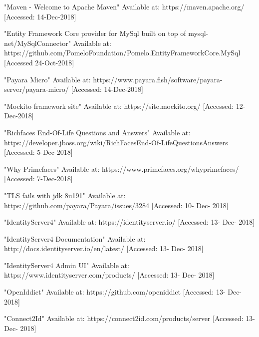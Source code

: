  "Maven - Welcome to Apache Maven"
Available at: https://maven.apache.org/ [Accessed: 14-Dec-2018]

 "Entity Framework Core provider for MySql built on top of mysql-net/MySqlConnector"
Available at: https://github.com/PomeloFoundation/Pomelo.EntityFrameworkCore.MySql
[Accessed 24-Oct-2018]

 "Payara Micro"
Available at: https://www.payara.fish/software/payara-server/payara-micro/ [Accessed: 14-Dec-2018]

 "Mockito framework site"
Available at: https://site.mockito.org/ [Accessed: 12-Dec-2018]

 "Richfaces End-Of-Life Questions and Answers"
Available at: https://developer.jboss.org/wiki/RichFacesEnd-Of-LifeQuestionsAnswers [Accessed: 5-Dec-2018]

 "Why Primefaces"
Available at: https://www.primefaces.org/whyprimefaces/ [Accessed: 7-Dec-2018]

 "TLS fails with jdk 8u191" Available at: https://github.com/payara/Payara/issues/3284 [Accessed: 10- Dec- 2018]

 "IdentityServer4" Available at: https://identityserver.io/ [Accessed: 13- Dec- 2018]

 "IdentityServer4 Documentation" Available at: http://docs.identityserver.io/en/latest/ [Accessed: 13- Dec- 2018]

 "IdentityServer4 Admin UI" Available at: https://www.identityserver.com/products/ [Accessed: 13- Dec- 2018]

 "OpenIddict" Available at: https://github.com/openiddict [Accessed: 13- Dec- 2018]

 "Connect2Id" Available at: https://connect2id.com/products/server [Accessed: 13- Dec- 2018]
